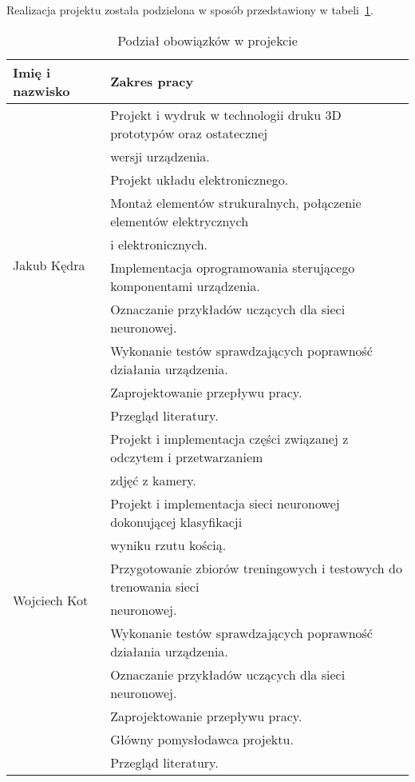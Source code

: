 Realizacja projektu została podzielona w sposób przedstawiony w tabeli~\ref{tab:podzial}.
\begin{table} [h]
    \centering
    \caption{Podział obowiązków w projekcie}
    \label{tab:podzial}
    \begin{tabular}{|l|l|}
        \hline
        Imię i nazwisko & Zakres pracy \\
        \hline
        \multirow{10}{*}{Jakub Kędra} 
            & Projekt i wydruk w technologii druku 3D prototypów oraz ostatecznej \\
            & wersji urządzenia. \\
            & Projekt układu elektronicznego. \\
            & Montaż elementów strukuralnych, połączenie elementów elektrycznych \\
            & i elektronicznych. \\
            & Implementacja oprogramowania sterującego komponentami urządzenia. \\
            & Oznaczanie przykładów uczących dla sieci neuronowej. \\
            & Wykonanie testów sprawdzających poprawność działania urządzenia. \\
            & Zaprojektowanie przepływu pracy. \\
            & Przegląd literatury. \\
        \hline
        \multirow{11}{*}{Wojciech Kot} 
            & Projekt i implementacja części związanej z odczytem i przetwarzaniem \\
            & zdjęć z kamery. \\
            & Projekt i implementacja sieci neuronowej dokonującej klasyfikacji \\
            & wyniku rzutu kością. \\
            & Przygotowanie zbiorów treningowych i testowych do trenowania sieci \\
            & neuronowej. \\
            & Wykonanie testów sprawdzających poprawność działania urządzenia. \\
            & Oznaczanie przykładów uczących dla sieci neuronowej. \\
            & Zaprojektowanie przepływu pracy. \\
            & Główny pomysłodawca projektu. \\
            & Przegląd literatury. \\
        \hline

\end{tabular}
\end{table}
